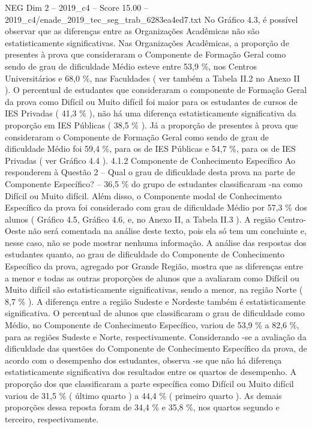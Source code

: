 \begin{textsample}{NEG Dim 2 – 2019\_c4 – Score 15.00 – 2019\_c4/enade\_2019\_tec\_seg\_trab\_6283ea4ed7.txt}
No Gráfico 4.3, é possível observar que as diferenças entre as Organizações Acadêmicas não são estatisticamente significativas.
Nas Organizações Acadêmicas, a proporção de presentes à prova que consideraram o Componente de Formação Geral como sendo de grau de dificuldade Médio esteve entre 53,9 \%, nos Centros Universitários e 68,0 \%, nas Faculdades ( ver também a Tabela II.2 no Anexo II ).
O percentual de estudantes que consideraram o componente de Formação Geral da prova como Difícil ou Muito difícil foi maior para os estudantes de cursos de IES Privadas ( 41,3 \% ), não há uma diferença estatisticamente significativa da proporção em IES Públicas ( 38,5 \% ).
Já a proporção de presentes à prova que consideraram o Componente de Formação Geral como sendo de grau de dificuldade Médio foi 59,4 \%, para os de IES Públicas e 54,7 \%, para os de IES Privadas ( ver Gráfico 4.4 ). 4.1.2 Componente de Conhecimento Específico Ao responderem à Questão 2 – Qual o grau de dificuldade desta prova na parte de Componente Específico? – 36,5 \% do grupo de estudantes classificaram -na como Difícil ou Muito difícil.
Além disso, o Componente modal de Conhecimento Específico da prova foi considerado com grau de dificuldade Médio por 57,3 \% dos alunos ( Gráfico 4.5, Gráfico 4.6, e, no Anexo II, a Tabela II.3 ).
A região Centro-Oeste não será comentada na análise deste texto, pois ela só tem um concluinte e, nesse caso, não se pode mostrar nenhuma informação.
A análise das respostas dos estudantes quanto, ao grau de dificuldade do Componente de Conhecimento Específico da prova, agregado por Grande Região, mostra que as diferenças entre a menor e todas as outras proporções de alunos que a avaliaram como Difícil ou Muito difícil são estatisticamente significativas, sendo a menor, na região Norte ( 8,7 \% ).
A diferença entre a região Sudeste e Nordeste também é estatisticamente significativa.
O percentual de alunos que classificaram o grau de dificuldade como Médio, no Componente de Conhecimento Específico, variou de 53,9 \% a 82,6 \%, para as regiões Sudeste e Norte, respectivamente.
Considerando -se a avaliação da dificuldade das questões do Componente de Conhecimento Específico da prova, de acordo com o desempenho dos estudantes, observa -se que não há diferença estatisticamente significativa dos resultados entre os quartos de desempenho.
A proporção dos que classificaram a parte específica como Difícil ou Muito difícil variou de 31,5 \% ( último quarto ) a 44,4 \% ( primeiro quarto ).
As demais proporções dessa reposta foram de 34,4 \% e 35,8 \%, nos quartos segundo e terceiro, respectivamente.

\end{textsample}
